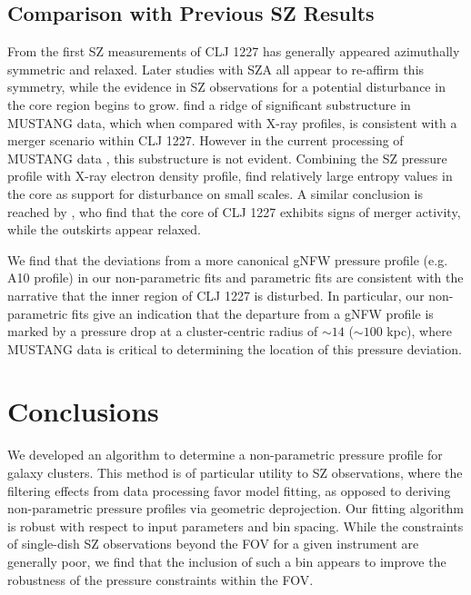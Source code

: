 \documentclass[twocolumn,traditabstract]{aa}
\begin{document}
\subsection{Comparison with Previous SZ Results}
\label{sec:prev_res}

From the first SZ measurements of CLJ 1227 \citep[made with BIMA][]{joy2001} has generally appeared
azimuthally symmetric and relaxed. Later studies with SZA \citep{muchovej2007,mroczkowski2009,mroczkowski2011}
all appear to re-affirm this symmetry, while the evidence in SZ observations for a potential disturbance
in the core region begins to grow. \citet{korngut2011} find a ridge of significant substructure in
MUSTANG data, which when compared with X-ray profiles, is consistent with a merger scenario within
CLJ 1227. However in the current processing of MUSTANG data \citep{romero2016},
this substructure is not evident. Combining the SZ pressure profile with X-ray electron density profile,
\citet{adam2015} find relatively large entropy values in the core as support for disturbance on small scales.
A similar conclusion is reached by \citet{rumsey2016}, who find that the core
of CLJ 1227 exhibits signs of merger activity, while the outskirts appear relaxed.

We find that the deviations from a more canonical gNFW pressure profile (e.g. A10 profile) in our
non-parametric fits and parametric fits are consistent with the narrative that the inner region of
CLJ 1227 is disturbed. In particular, our non-parametric fits give an indication that the departure
from a gNFW profile is marked by a pressure drop at a cluster-centric radius of $\sim 14$\asecs
($\sim 100$ kpc), where MUSTANG data is critical to determining the location of this pressure deviation.


\section{Conclusions}
\label{sec:conclusions}

We developed an algorithm to determine a non-parametric pressure profile for galaxy clusters.
This method is of particular utility to SZ observations, where the filtering effects from data
processing favor model fitting, as opposed to deriving non-parametric pressure profiles via
geometric deprojection. Our fitting algorithm is robust with respect to input parameters and
bin spacing. While the constraints of single-dish SZ observations beyond the FOV for a given
instrument are generally poor, we find that the inclusion of such a bin appears to improve
the robustness of the pressure constraints within the FOV.
\end{document}
